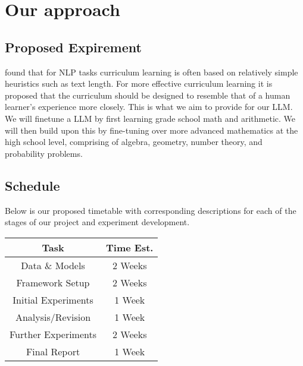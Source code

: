 \section{Our approach}

\subsection{Proposed Expirement}

\citet{soviany2022curriculumlearningsurvey} found that for NLP tasks curriculum learning is often based on relatively simple heuristics such as text length. For more effective curriculum learning it is proposed that the curriculum should be designed to resemble that of a human learner's experience more closely. This is what we aim to provide for our LLM. We will finetune a LLM by first learning grade school math and arithmetic. We will then build upon this by fine-tuning over more advanced mathematics at the high school level, comprising of algebra, geometry, number theory, and probability problems.

\subsection{Schedule}

Below is our proposed timetable with corresponding descriptions for each of the stages of our project and experiment development.

\begin{center}
\begin{tabular}{cc}
     Task & Time Est. \\\hline
     Data \& Models & 2 Weeks \\
     Framework Setup & 2 Weeks \\
     Initial Experiments & 1 Week \\
     Analysis/Revision & 1 Week \\
     Further Experiments & 2 Weeks \\
     Final Report & 1 Week \\
\end{tabular}
\end{center}

